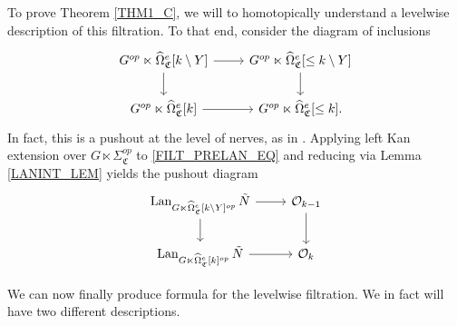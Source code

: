 \documentclass[a4paper,10pt
,draft
]{article}%
\renewcommand{\hat}{\widehat}
\renewcommand{\1}{\eta}%
\newcommand{\SC}{\Sigma_{\mathfrak C}}
\begin{document}
To prove Theorem \ref{THM1_C}, we will to homotopically understand a levelwise description of this filtration.
To that end, consider the diagram of inclusions
\begin{equation}
      \label{FILT_PRELAN_EQ}
      \begin{tikzcd}
            G^{op} \ltimes \hat\Omega_{\mathfrak C}^e[k \setminus Y] \arrow[r] \arrow[d]
            &
            G^{op} \ltimes \hat\Omega_{\mathfrak C}^e[\leq k \setminus Y] \arrow[d]
            \\
            G^{op} \ltimes \hat\Omega_{\mathfrak C}^e[k] \arrow[r]
            &
            G^{op} \ltimes \hat\Omega_{\mathfrak C}^e[\leq k].
      \end{tikzcd}
\end{equation}
In fact, this is a pushout at the level of nerves, as in \cite[(5.65)]{BP_geo}.
Applying left Kan extension over $G \ltimes \SC^{op}$ to \eqref{FILT_PRELAN_EQ} and reducing via Lemma \ref{LANINT_LEM}
yields the pushout diagram
\begin{equation}
      \begin{tikzcd}
            \label{FILT_LAN_EQ}
            \Lan_{G \ltimes \hat\Omega_{\mathfrak C}^e[k \setminus Y]^{op}} \tilde N \arrow[r] \arrow[d]
            &
            \O_{k-1} \arrow[d]
            \\
            \Lan_{G \ltimes \hat\Omega_{\mathfrak C}^e[k]^{op}} \tilde N \arrow[r]
            &
            \O_k
      \end{tikzcd}
\end{equation}


We can now finally produce formula for the levelwise filtration.
We in fact will have two different descriptions.
\end{document}
